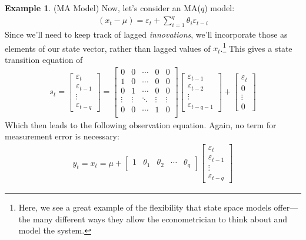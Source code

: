 \documentclass[12pt]{article}
\theoremstyle{plain}
\theoremstyle{definition}
\newtheorem{ex}[thm]{Example}
\theoremstyle{remark}
\begin{document}
\begin{ex}(MA Model)
Now, let's consider an MA($q$) model:
\begin{align*}
  (x_t - \mu) = \varepsilon_t
  + \sum^q_{i=1} \theta_i  \varepsilon_{t-i}
\end{align*}
Since we'll need to keep track of lagged \emph{innovations}, we'll
incorporate those as elements of our state vector, rather than lagged
values of $x_t$.\footnote{%
  Here, we see a great example of the flexibility that state space
  models offer---the many different ways they allow the econometrician
  to think about and model the system.
}
This gives a state transition equation of
\begin{align*}
  s_t =
  \begin{bmatrix}
  \varepsilon_t \\ \varepsilon_{t-1} \\
  \vdots \\ \varepsilon_{t-q}
  \end{bmatrix}
  = \begin{bmatrix}
  0 & 0 & \cdots & 0 & 0 \\
  1 & 0 & \cdots & 0 & 0\\
  0 & 1 & \cdots & 0 & 0\\
  \vdots & \vdots & \ddots & \vdots & \vdots\\
  0 & 0 & \cdots & 1 & 0\\
  \end{bmatrix}
  \begin{bmatrix}
  \varepsilon_{t-1} \\ \varepsilon_{t-2} \\
  \vdots \\ \varepsilon_{t-q-1}
  \end{bmatrix}
  + \begin{bmatrix}
  \varepsilon_t \\ 0 \\ \vdots \\ 0
  \end{bmatrix}
\end{align*}
Which then leads to the following observation equation. Again, no term
for measurement error is necessary:
\begin{align*}
  y_t =
  x_t
  = \mu +
  \begin{bmatrix} 1 & \theta_1 & \theta_2 & \cdots &
    \theta_q \end{bmatrix}
  \begin{bmatrix}
  \varepsilon_t \\ \varepsilon_{t-1} \\
  \vdots \\ \varepsilon_{t-q}
  \end{bmatrix}
\end{align*}
\end{ex}
\end{document}
